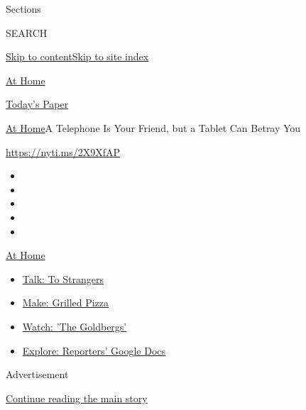Sections

SEARCH

\protect\hyperlink{site-content}{Skip to
content}\protect\hyperlink{site-index}{Skip to site index}

\href{https://www.nytimes.com/spotlight/at-home}{At Home}

\href{https://myaccount.nytimes.com/auth/login?response_type=cookie\&client_id=vi}{}

\href{https://www.nytimes.com/section/todayspaper}{Today's Paper}

\href{/spotlight/at-home}{At Home}\textbar{}A Telephone Is Your Friend,
but a Tablet Can Betray You

\url{https://nyti.ms/2X9XfAP}

\begin{itemize}
\item
\item
\item
\item
\item
\end{itemize}

\href{https://www.nytimes.com/spotlight/at-home?action=click\&pgtype=Article\&state=default\&region=TOP_BANNER\&context=at_home_menu}{At
Home}

\begin{itemize}
\tightlist
\item
  \href{https://www.nytimes.com/2020/08/03/well/family/the-benefits-of-talking-to-strangers.html?action=click\&pgtype=Article\&state=default\&region=TOP_BANNER\&context=at_home_menu}{Talk:
  To Strangers}
\item
  \href{https://www.nytimes.com/2020/08/01/at-home/coronavirus-make-pizza-on-a-grill.html?action=click\&pgtype=Article\&state=default\&region=TOP_BANNER\&context=at_home_menu}{Make:
  Grilled Pizza}
\item
  \href{https://www.nytimes.com/2020/07/31/arts/television/goldbergs-abc-stream.html?action=click\&pgtype=Article\&state=default\&region=TOP_BANNER\&context=at_home_menu}{Watch:
  'The Goldbergs'}
\item
  \href{https://www.nytimes.com/interactive/2020/at-home/even-more-reporters-editors-diaries-lists-recommendations.html?action=click\&pgtype=Article\&state=default\&region=TOP_BANNER\&context=at_home_menu}{Explore:
  Reporters' Google Docs}
\end{itemize}

Advertisement

\protect\hyperlink{after-top}{Continue reading the main story}


